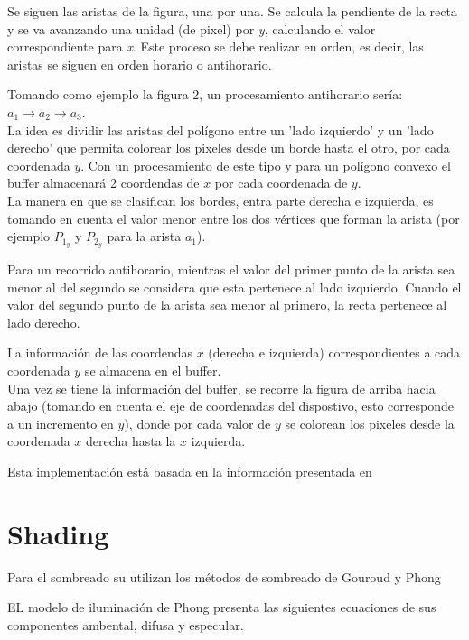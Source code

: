 \documentclass[12pt]{article}
\begin{document}
Se siguen las aristas de la figura, una por una. Se calcula la pendiente de la recta y se va avanzando una unidad (de pixel) por \textit{y}, calculando el valor correspondiente para \textit{x}. Este proceso se debe realizar en orden, es decir, las aristas se siguen en orden horario o antihorario. 

Tomando como ejemplo la figura 2, un procesamiento antihorario sería: $a_{1} \rightarrow a_{2} \rightarrow a_{3}$.\\

La idea es dividir las aristas del polígono entre un 'lado izquierdo' y un 'lado derecho' que permita colorear los pixeles desde un borde hasta el otro, por cada coordenada $y$. 
Con un procesamiento de este tipo y para un polígono convexo el buffer almacenará 2 coordendas de $x$ por cada coordenada de $y$.\\

La manera en que se clasifican los bordes, entra parte derecha e izquierda, es tomando en cuenta el valor menor entre los dos vértices que forman la arista (por ejemplo $P_{1_{y}}$ y $P_{2_{y}}$ para la arista $a_{1}$).

Para un recorrido antihorario, mientras el valor del primer punto de la arista sea menor al del segundo se considera que esta pertenece al lado izquierdo. Cuando el valor del segundo punto de la arista sea menor al primero, la recta pertenece al lado derecho. 

La información de las coordendas $x$ (derecha e izquierda) correspondientes a cada coordenada $y$ se almacena en el buffer.\\

Una vez se tiene la información del buffer, se recorre la figura de arriba hacia abajo (tomando en cuenta el eje de coordenadas del dispostivo, esto corresponde a un incremento en  $y$), donde por cada valor de $y$ se colorean los pixeles desde la coordenada $x$ derecha hasta la $x$ izquierda.

Esta implementación está basada en la información presentada en \cite{bb}


\section{Shading}
Para el sombreado su utilizan los métodos de sombreado de Gouroud y Phong 

EL modelo de iluminación de Phong presenta las siguientes ecuaciones de sus componentes ambental, difusa y especular.
\end{document}
